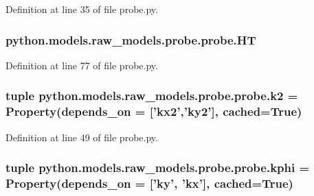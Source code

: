 Definition at line 35 of file probe.\-py.

\hypertarget{classpython_1_1models_1_1raw__models_1_1probe_1_1probe_acdb528566f6dd406f1e3fb66509b0d7f}{
\subsubsection[{H\-T}]{\setlength{\rightskip}{0pt plus 5cm}python.\-models.\-raw\-\_\-models.\-probe.\-probe.\-H\-T}}\label{classpython_1_1models_1_1raw__models_1_1probe_1_1probe_acdb528566f6dd406f1e3fb66509b0d7f}


Definition at line 77 of file probe.\-py.

\hypertarget{classpython_1_1models_1_1raw__models_1_1probe_1_1probe_afaa44a1195218b52f3a6a5a094b02ab1}{
\subsubsection[{k2}]{\setlength{\rightskip}{0pt plus 5cm}tuple python.\-models.\-raw\-\_\-models.\-probe.\-probe.\-k2 = Property(depends\-\_\-on = \mbox{[}'{\bf kx2}','{\bf ky2}'\mbox{]}, cached=True)\hspace{0.3cm}{\ttfamily [static]}}}\label{classpython_1_1models_1_1raw__models_1_1probe_1_1probe_afaa44a1195218b52f3a6a5a094b02ab1}


Definition at line 49 of file probe.\-py.

\hypertarget{classpython_1_1models_1_1raw__models_1_1probe_1_1probe_ae2ba813fa450b7a2fcaca58479fb2e46}{
\subsubsection[{kphi}]{\setlength{\rightskip}{0pt plus 5cm}tuple python.\-models.\-raw\-\_\-models.\-probe.\-probe.\-kphi = Property(depends\-\_\-on = \mbox{[}'{\bf ky}', '{\bf kx}'\mbox{]}, cached=True)\hspace{0.3cm}{\ttfamily [static]}}}\label{classpython_1_1models_1_1raw__models_1_1probe_1_1probe_ae2ba813fa450b7a2fcaca58479fb2e46}


